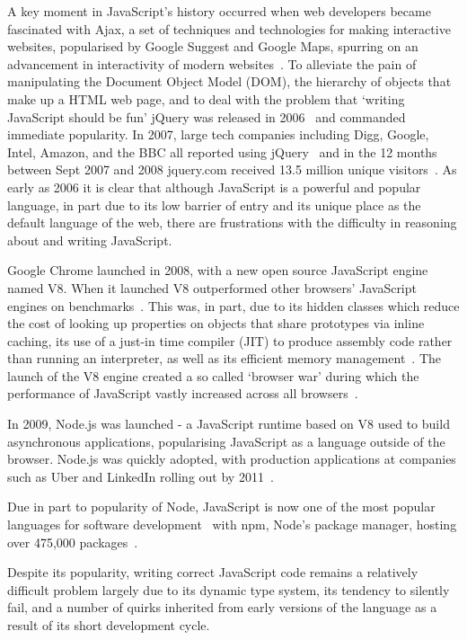 \documentclass[]{final_report}
\begin{document}
A key moment in JavaScript's history occurred when web developers became fascinated with Ajax, a set of techniques and technologies for making interactive websites, popularised by Google Suggest and Google Maps, spurring on an advancement in interactivity of modern websites~\cite{ajax}. To alleviate the pain of manipulating the Document Object Model (DOM), the hierarchy of objects that make up a HTML web page, and to deal with the problem that `writing JavaScript should be fun' jQuery was released in 2006~\cite{historyofjquery} and commanded immediate popularity. In 2007, large tech companies including Digg, Google, Intel, Amazon, and the BBC all reported using jQuery~\cite{historyofjquery} and in the 12 months between Sept 2007 and 2008 jquery.com received 13.5 million unique visitors~\cite{stateofjquery}. As early as 2006 it is clear that although JavaScript is a powerful and popular language, in part due to its low barrier of entry and its unique place as the default language of the web, there are frustrations with the difficulty in reasoning about and writing JavaScript.

Google Chrome launched in 2008, with a new open source JavaScript engine named V8. When it launched V8 outperformed other browsers' JavaScript engines on benchmarks~\cite{chromebenchmarks}. This was, in part, due to its hidden classes which reduce the cost of looking up properties on objects that share prototypes via inline caching, its use of a just-in time compiler (JIT) to produce assembly code rather than running an interpreter, as well as its efficient memory management~\cite{chromeengine, chromeengine2}. The launch of the V8 engine created a so called `browser war' during which the performance of JavaScript vastly increased across all browsers~\cite{knowyourenginesmozilla}.

In 2009, Node.js was launched - a JavaScript runtime based on V8 used to build asynchronous applications, popularising JavaScript as a language outside of the browser. Node.js was quickly adopted, with production applications at companies such as Uber and LinkedIn rolling out by 2011~\cite{linkedinusesnode, uberusesnode}. 

Due in part to popularity of Node, JavaScript is now one of the most popular languages for software development~\cite{stackoverflowsurvey, tiobeindex2017nov} with npm, Node's package manager, hosting over 475,000 packages~\cite{npm}.

Despite its popularity, writing correct JavaScript code remains a relatively difficult problem largely due to its dynamic type system, its tendency to silently fail, and a number of quirks inherited from early versions of the language as a result of its short development cycle.
\end{document}
